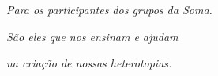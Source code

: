 \pagebreak
\thispagestyle{empty}

\begin{vplace}[30]
\begin{flushright}
\emph{Para os participantes dos grupos da Soma.}

\emph{São eles que nos ensinam e ajudam}

\emph{na criação de nossas heterotopias.}
\end{flushright}
\end{vplace}







